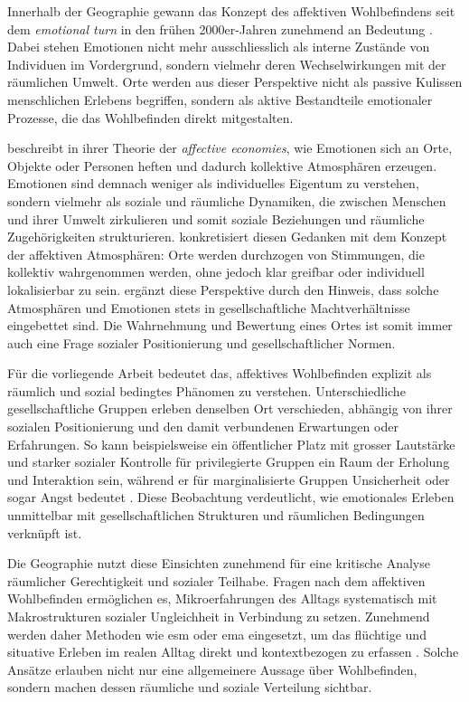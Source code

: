 Innerhalb der Geographie gewann das Konzept des affektiven Wohlbefindens seit dem \emph{emotional turn} in den frühen 2000er-Jahren zunehmend an Bedeutung \parencite{hoSocialGeographyIII2024}. Dabei stehen Emotionen nicht mehr ausschliesslich als interne Zustände von Individuen im Vordergrund, sondern vielmehr deren Wechselwirkungen mit der räumlichen Umwelt. Orte werden aus dieser Perspektive nicht als passive Kulissen menschlichen Erlebens begriffen, sondern als aktive Bestandteile emotionaler Prozesse, die das Wohlbefinden direkt mitgestalten.

\textcite{ahmedAffectiveEconomies2004} beschreibt in ihrer Theorie der \emph{affective economies}, wie Emotionen sich an Orte, Objekte oder Personen heften und dadurch kollektive Atmosphären erzeugen. Emotionen sind demnach weniger als individuelles Eigentum zu verstehen, sondern vielmehr als soziale und räumliche Dynamiken, die zwischen Menschen und ihrer Umwelt zirkulieren und somit soziale Beziehungen und räumliche Zugehörigkeiten strukturieren. \textcite{andersonAffectiveAtmospheres2009} konkretisiert diesen Gedanken mit dem Konzept der affektiven Atmosphären: Orte werden durchzogen von Stimmungen, die kollektiv wahrgenommen werden, ohne jedoch klar greifbar oder individuell lokalisierbar zu sein. \textcite{hoSocialGeographyIII2024} ergänzt diese Perspektive durch den Hinweis, dass solche Atmosphären und Emotionen stets in gesellschaftliche Machtverhältnisse eingebettet sind. Die Wahrnehmung und Bewertung eines Ortes ist somit immer auch eine Frage sozialer Positionierung und gesellschaftlicher Normen.

Für die vorliegende Arbeit bedeutet das, affektives Wohlbefinden explizit als räumlich und sozial bedingtes Phänomen zu verstehen. Unterschiedliche gesellschaftliche Gruppen erleben denselben Ort verschieden, abhängig von ihrer sozialen Positionierung und den damit verbundenen Erwartungen oder Erfahrungen. So kann beispielsweise ein öffentlicher Platz mit grosser Lautstärke und starker sozialer Kontrolle für privilegierte Gruppen ein Raum der Erholung und Interaktion sein, während er für marginalisierte Gruppen Unsicherheit oder sogar Angst bedeutet \parencite{collectiveSafeSpaceReconceptualization2014}. Diese Beobachtung verdeutlicht, wie emotionales Erleben unmittelbar mit gesellschaftlichen Strukturen und räumlichen Bedingungen verknüpft ist.

Die Geographie nutzt diese Einsichten zunehmend für eine kritische Analyse räumlicher Gerechtigkeit und sozialer Teilhabe. Fragen nach dem affektiven Wohlbefinden ermöglichen es, Mikroerfahrungen des Alltags systematisch mit Makrostrukturen sozialer Ungleichheit in Verbindung zu setzen. Zunehmend werden daher Methoden wie \acrfull{esm} oder \acrfull{ema} eingesetzt, um das flüchtige und situative Erleben im realen Alltag direkt und kontextbezogen zu erfassen \parencite{songRecallBiasIntegrating2025}. Solche Ansätze erlauben nicht nur eine allgemeinere Aussage über Wohlbefinden, sondern machen dessen räumliche und soziale Verteilung sichtbar.

